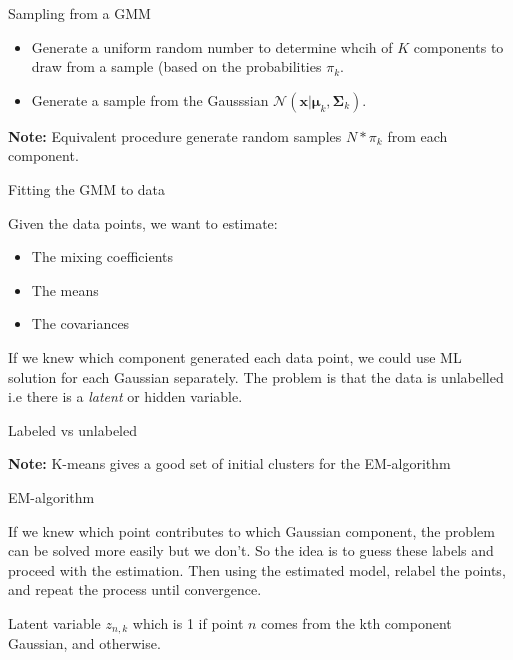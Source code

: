 \documentclass[12pt]{beamer}
\begin{document}
\begin{frame}{Sampling from a GMM} 

\begin{itemize} 
\item Generate a uniform random number to determine 
whcih of $K$ components to draw from a sample (based on 
the probabilities $\pi_k$. 
\item Generate a sample from the Gausssian 
$\mathcal{N}({\boldsymbol x}| {\boldsymbol \mu}_k, {\boldsymbol \Sigma}_k)$. 

\end{itemize} 

{\bf Note: } Equivalent procedure generate random samples $N * \pi_k$  
from each component. 

\end{frame} 

\begin{frame}{Fitting the GMM to data} 

Given the data points, we want to estimate: 
\begin{itemize} 
\item The mixing coefficients 
\item The means 
\item The covariances 
\end{itemize} 


If we knew which component generated each data point, we could use ML
solution for each Gaussian separately. The problem is that the data is
unlabelled i.e there is a {\it latent} or hidden variable.

\end{frame} 


\begin{frame}{Labeled vs unlabeled} 

{\bf Note:} K-means gives a good set of initial clusters for the 
EM-algorithm

\end{frame}

\begin{frame}{EM-algorithm} 

If we knew which point contributes to which Gaussian component, the problem 
can be solved more easily but we don't. So the idea is to guess these labels 
and proceed with the estimation. Then using the estimated model, relabel the points, and repeat the process until convergence. 

Latent variable $z_{n,k}$ which is 1 if point $n$ comes from the kth component Gaussian, and otherwise. 

\end{frame}  
\end{document}
